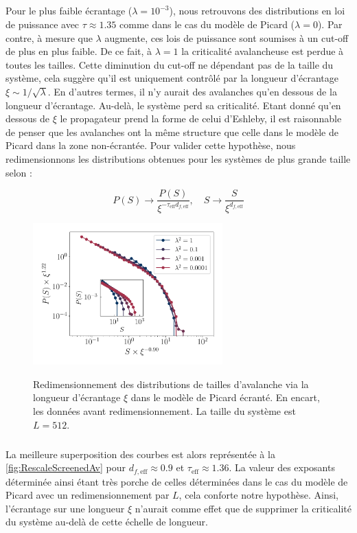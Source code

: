 \subparagraph{}Pour le plus faible écrantage ($\lambda = 10^{-3}$), nous retrouvons des distributions en loi de puissance avec $\tau \approx 1.35$ comme dans le cas du modèle de Picard ($\lambda = 0$). Par contre, à mesure que $\lambda$ augmente, ces lois de puissance sont soumises à un cut-off de plus en plus faible. De ce fait, à $\lambda=1$ la criticalité avalancheuse est perdue à toutes les tailles. Cette diminution du cut-off ne dépendant pas de la taille du système, cela suggère qu'il est uniquement contrôlé par la longueur d'écrantage $\xi \sim 1/\sqrt{\lambda}$. En d'autres termes, il n'y aurait des avalanches qu'en dessous de la longueur d'écrantage. Au-delà, le système perd sa criticalité. Etant donné qu'en dessous de $\xi$ le propagateur prend la forme de celui d'Eshleby, il est raisonnable de penser que les avalanches ont la même structure que celle dans le modèle de Picard dans la zone non-écrantée. Pour valider cette hypothèse, nous redimensionnons les distributions obtenues pour les systèmes de plus grande taille selon :

\begin{equation}
	P(S) \rightarrow \frac{P(S)}{\xi^{-\tau_\text{eff}d_{f,\text{eff}}}},\quad S\rightarrow \frac{S}{\xi^{d_{f,\text{eff}}}}
\end{equation}

\begin{figure}[h]
	\centering
	\includegraphics[width=0.65\textwidth]{Chapitre6/Figures/RescaleScreenedAv.pdf}
	\label{fig:RescaleScreenedAv}
	\caption{Redimensionnement des distributions de tailles d'avalanche via la longueur d'écrantage $\xi$ dans le modèle de Picard écranté. En encart, les données avant redimensionnement. La taille du système est $L=512$.}
\end{figure}

\subparagraph{}La meilleure superposition des courbes est alors représentée à la \autoref{fig:RescaleScreenedAv} pour $d_{f,\text{eff}}\approx 0.9$ et $\tau_\text{eff} \approx 1.36$. La valeur des exposants déterminée ainsi étant très porche de celles déterminées dans le cas du modèle de Picard avec un redimensionnement par $L$, cela conforte notre hypothèse. Ainsi, l'écrantage sur une longueur $\xi$ n'aurait comme effet que de supprimer la criticalité du système au-delà de cette échelle de longueur.

